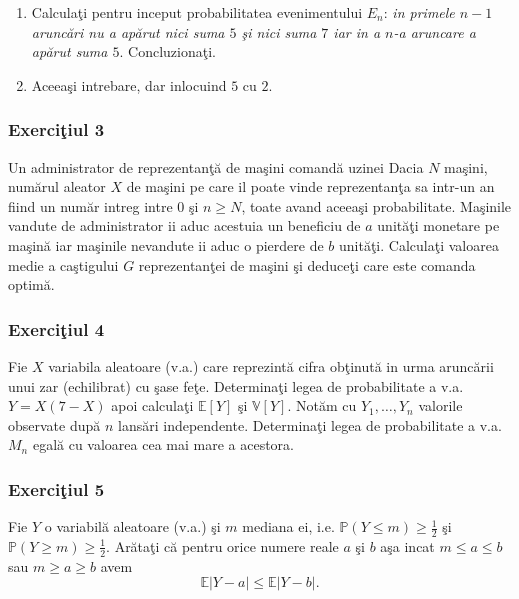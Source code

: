 \documentclass[]{article}
\def\PP{{\mathbb P}}
\def\EE{{\mathbb E}}
\def\VV{{\mathbb V}}
\begin{document}
\begin{enumerate}
\def\labelenumi{\arabic{enumi}.}
\item
  Calcula\c ti pentru inceput probabilitatea evenimentului \(E_n\):
  \emph{in primele \(n-1\) arunc\u ari nu a ap\u arut nici suma \(5\)
  \c si nici suma \(7\) iar in a \(n\)-a aruncare a ap\u arut suma
  \(5\)}. Concluziona\c ti.
\item
  Aceea\c si intrebare, dar inlocuind \(5\) cu \(2\).
\end{enumerate}

\subsubsection{\texorpdfstring{Exerci\c tiul
3}{Exerciiul 3}}\label{exerciiul-3}

Un administrator de reprezentan\c t\u a de ma\c sini comand\u a uzinei
Dacia \(N\) ma\c sini, num\u arul aleator \(X\) de ma\c sini pe care il
poate vinde reprezentan\c ta sa intr-un an fiind un num\u ar intreg
intre \(0\) \c si \(n\geq N\), toate avand aceea\c si probabilitate.
Ma\c sinile vandute de administrator ii aduc acestuia un beneficiu de
\(a\) unit\u a\c ti monetare pe ma\c sin\u a iar ma\c sinile nevandute
ii aduc o pierdere de \(b\) unit\u a\c ti. Calcula\c ti valoarea medie a
ca\c stigului \(G\) reprezentan\c tei de ma\c sini \c si deduce\c ti
care este comanda optim\u a.

\subsubsection{\texorpdfstring{Exerci\c tiul
4}{Exerciiul 4}}\label{exerciiul-4}

Fie \(X\) variabila aleatoare (v.a.) care reprezint\u a cifra
ob\c tinut\u a in urma arunc\u arii unui zar (echilibrat) cu \c sase
fe\c te. Determina\c ti legea de probabilitate a v.a. \(Y=X(7-X)\) apoi
calcula\c ti \(\EE[Y]\) \c si \(\VV[Y]\). Not\u am cu
\(Y_1, \dots, Y_n\) valorile observate dup\u a \(n\) lans\u ari
independente. Determina\c ti legea de probabilitate a v.a. \(M_n\)
egal\u a cu valoarea cea mai mare a acestora.

\subsubsection{\texorpdfstring{Exerci\c tiul
5}{Exerciiul 5}}\label{exerciiul-5}

Fie \(Y\) o variabil\u a aleatoare (v.a.) \c si \(m\) mediana ei, i.e.
\(\PP(Y\leq m)\geq\frac{1}{2}\) \c si \(\PP(Y\geq m)\geq\frac{1}{2}\).
Ar\u ata\c ti c\u a pentru orice numere reale \(a\) \c si \(b\) a\c sa
incat \(m\leq a\leq b\) sau \(m\geq a\geq b\) avem \[
\EE|Y-a|\leq\EE|Y-b|.
\]
\end{document}

